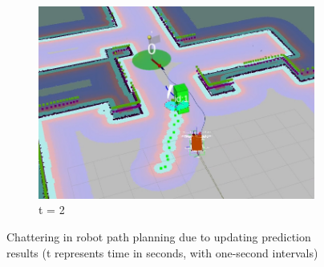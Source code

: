 \begin{figure}[H]
  \begin{subfigure}{\linewidth}
    \centering
    \includegraphics[keepaspectratio, scale=0.28]{images/seq-21.png}
    \caption{t = 2}
    \label{Fig:seq-21}
  \end{subfigure}
  
  
  \caption{\centering Chattering in robot path planning due to updating prediction results \newline (t represents time in seconds, with one-second intervals)}
  \label{Fig:sequences}
\end{figure}

\newpage
